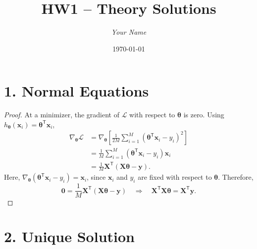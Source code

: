 \documentclass[11pt]{article}
\title{HW1 -- Theory Solutions}
\author{\textit{Your Name}}
\date{\today}
\newcommand{\transpose}{^{\mathsf T}}
\newcommand{\loss}{\mathcal{L}}
\begin{document}
\maketitle

\section*{1. Normal Equations}

\begin{proof}
At a minimizer, the gradient of $\loss$ with respect to $\bm{\theta}$ is zero. Using $h_{\bm{\theta}}(\bm{x}_i)=\bm{\theta}\transpose\bm{x}_i$,
\begin{align*}
\nabla_{\bm{\theta}}\loss
&=\nabla_{\bm{\theta}}\left[\frac{1}{2M}\sum_{i=1}^{M}
	(\bm{\theta}\transpose\bm{x}_i-y_i)^2\right] \\
&=\frac{1}{M}\sum_{i=1}^{M}
	(\bm{\theta}\transpose\bm{x}_i-y_i)\bm{x}_i \\
&=\frac{1}{M}\bm{X}\transpose(\bm{X}\bm{\theta}-\bm{y}).
\end{align*}
Here, $\nabla_{\bm{\theta}}(\bm{\theta}\transpose\bm{x}_i-y_i)=\bm{x}_i$, since $\bm{x}_i$ and $y_i$ are fixed with respect to $\bm{\theta}$. Therefore,
\[
\bm{0}=\frac{1}{M}\bm{X}\transpose(\bm{X}\bm{\theta}-\bm{y})
\quad\Longrightarrow\quad
\bm{X}\transpose\bm{X}\bm{\theta}=\bm{X}\transpose\bm{y}.
\]
\end{proof}

\section*{2. Unique Solution}
\end{document}
